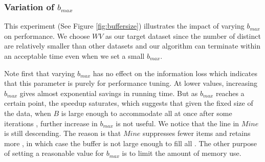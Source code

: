 \subsubsection{Variation of $b_{max}$}\label{sec:eval:buffersize}

This experiment (See Figure \ref{fig:buffersize}) illustrates the impact of varying $b_{max}$ on performance.
We choose $WV$ as our target dataset since the number of
distinct \qids are relatively smaller than other datasets and our algorithm
can terminate within an acceptable time even when we set a small $b_{max}$.

Note first that varying $b_{max}$ has no effect on the information loss which
indicates that this parameter is purely for performance tuning.
At lower values, increasing $b_{max}$ gives almost exponential
savings in running time. But as $b_{max}$ reaches a certain point, the speedup
saturates, which suggests that given the fixed size of the data,
when $B$ is large enough to accommodate all \qids at once after some iterations
, further increase in $b_{max}$ is not useful.
We notice that the line in $Mine$ is still descending. The reason is that
$Mine$ suppresses fewer items and retains more \qids, in which case
the buffer is not large enough to fill all \qids.
The other purpose of setting a reasonable value for $b_{max}$ is to limit the
amount of memory use.

